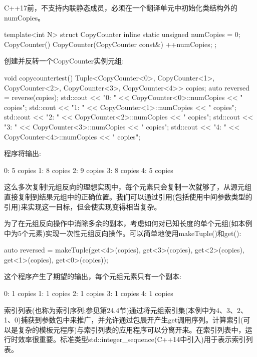 \begin{notice}
C++17前，不支持内联静态成员，必须在一个翻译单元中初始化类结构外的numCopies。
\end{notice}

\begin{cpp}
template<int N>
struct CopyCounter
{
	inline static unsigned numCopies = 0;
	CopyCounter() {
	}
	CopyCounter(CopyCounter const&) {
		++numCopies;
	}
};
\end{cpp}

创建并反转一个CopyCounter实例元组:

\begin{cpp}
void copycountertest()
{
	Tuple<CopyCounter<0>, CopyCounter<1>, CopyCounter<2>,
			CopyCounter<3>, CopyCounter<4>> copies;
	auto reversed = reverse(copies);
	std::cout << "0: " << CopyCounter<0>::numCopies << " copies\n";
	std::cout << "1: " << CopyCounter<1>::numCopies << " copies\n";
	std::cout << "2: " << CopyCounter<2>::numCopies << " copies\n";
	std::cout << "3: " << CopyCounter<3>::numCopies << " copies\n";
	std::cout << "4: " << CopyCounter<4>::numCopies << " copies\n";
}
\end{cpp}

程序将输出:

\begin{shell}
0: 5 copies
1: 8 copies
2: 9 copies
3: 8 copies
4: 5 copies
\end{shell}

这么多次复制!元组反向的理想实现中，每个元素只会复制一次就够了，从源元组直接复制到结果元组中的正确位置。我们可以通过引用(包括使用中间参数类型的引用)来实现这一目标，但会使实现变得相当复杂。

为了在元组反向操作中消除多余的副本，考虑如何对已知长度的单个元组(如本例中为5个元素)实现一次性元组反向操作。可以简单地使用makeTuple()和get():

\begin{cpp}
auto reversed = makeTuple(get<4>(copies), get<3>(copies),
							get<2>(copies), get<1>(copies),
							get<0>(copies));
\end{cpp}

这个程序产生了期望的输出，每个元组元素只有一个副本:

\begin{shell}
0: 1 copies
1: 1 copies
2: 1 copies
3: 1 copies
4: 1 copies
\end{shell}

索引列表(也称为索引序列;参见第24.4节)通过将元组索引集(本例中为4、3、2、1、0)捕获到参数包中来推广，并允许通过包展开产生get调用序列。计算索引(可以是复杂的模板元程序)与索引列表的应用程序可以分离开来。在索引列表中，运行时效率很重要。标准类型std::integer\_sequence(C++14中引入)用于表示索引列表。

